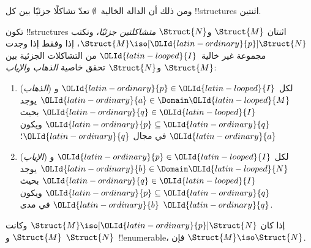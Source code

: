 \documentclass[../../../include/open-logic-section]{subfiles}
\begin{document}
ومن ذلك أن الدالة الخالية~$\emptyset$ تعدّ تشاكلًا جزئيًا بين كل
!!{structure}s اثنتين.

\begin{defn}
  تكون !!{structure}s اثنتان $\Struct{M}$ و$\Struct{N}$
  \emph{متشاكلتين جزئيًا}، ونكتب $\Struct{M} \iso[\OLId{latin-ordinary}{p}] \Struct{N}$، إذا
  وفقط إذا وجدت مجموعة غير خالية~$\OLId{latin-looped}{I}$ من التشاكلات الجزئية بين
  $\Struct{M}$ و$\Struct{N}$ تحقق خاصية \emph{الذهاب والإياب}:
  \begin{enumerate}
  \item (\emph{الذهاب}) لكل $\OLId{latin-ordinary}{p} \in \OLId{latin-looped}{I}$ و$\OLId{latin-ordinary}{a} \in \Domain \OLId{latin-looped}{M}$ يوجد
    $\OLId{latin-ordinary}{q} \in \OLId{latin-looped}{I}$ بحيث $\OLId{latin-ordinary}{p} \subseteq \OLId{latin-ordinary}{q}$ ويكون $\OLId{latin-ordinary}{a}$ في مجال $\OLId{latin-ordinary}{q}$؛
  \item (\emph{الإياب}) لكل $\OLId{latin-ordinary}{p} \in \OLId{latin-looped}{I}$ و$\OLId{latin-ordinary}{b} \in \Domain \OLId{latin-looped}{N}$ يوجد
    $\OLId{latin-ordinary}{q} \in \OLId{latin-looped}{I}$ بحيث $\OLId{latin-ordinary}{p} \subseteq \OLId{latin-ordinary}{q}$ ويكون $\OLId{latin-ordinary}{b}$ في مدى $\OLId{latin-ordinary}{q}$.
  \end{enumerate}
\end{defn}

\begin{thm}
  إذا كان $\Struct{M} \iso[\OLId{latin-ordinary}{p}] \Struct{N}$ وكانت $\Struct{M}$ و
  $\Struct{N}$~!!{enumerable}، فإن $\Struct{M} \iso \Struct{N}$.
\end{thm}
\end{document}
